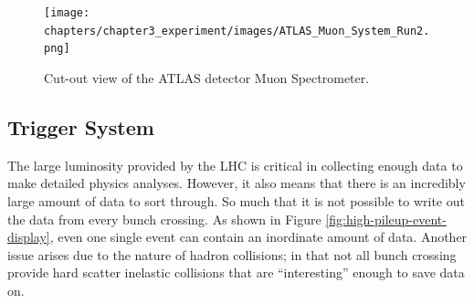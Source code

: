 		\begin{figure}[!ht]
		\centering
		\texttt{[image: chapters/chapter3\_experiment/images/ATLAS\_Muon\_System\_Run2.png]}
		\caption{Cut-out view of the \gls{ATLAS} detector Muon Spectrometer. \cite{atlas-schematics}}
		\label{fig:muon-spec}
		\end{figure}

	\subsection{Trigger System}\label{ssec:trigger}
		The large luminosity provided by the \gls{LHC} is critical in collecting enough data to make detailed physics analyses. However, it also means that there is an incredibly large amount of data to sort through. So much that it is not possible to write out the data from every bunch crossing. As shown in Figure \ref{fig:high-pileup-event-display}, even one single event can contain an inordinate amount of data. Another issue arises due to the nature of hadron collisions; in that not all bunch crossing provide hard scatter inelastic collisions that are ``interesting'' enough to save data on. 

